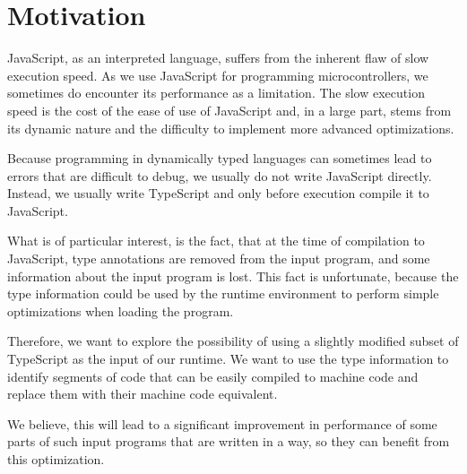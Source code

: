 \chapter{Motivation}

JavaScript, as an interpreted language, suffers from the inherent flaw of slow execution speed. As we use JavaScript for programming microcontrollers, we sometimes do encounter its performance as a limitation. The slow execution speed is the cost of the ease of use of JavaScript and, in a large part, stems from its dynamic nature and the difficulty to implement more advanced optimizations.

Because programming in dynamically typed languages can sometimes lead to errors that are difficult to debug, we usually do not write JavaScript directly. Instead, we usually write TypeScript and only before execution compile it to JavaScript.

What is of particular interest, is the fact, that at the time of compilation to JavaScript, type annotations are removed from the input program, and some information about the input program is lost. This fact is unfortunate, because the type information could be used by the runtime environment to perform simple optimizations when loading the program.

Therefore, we want to explore the possibility of using a slightly modified subset of TypeScript as the input of our runtime. We want to use the type information to identify segments of code that can be easily compiled to machine code and replace them with their machine code equivalent.


We believe, this will lead to a significant improvement in performance of some parts of such input programs that are written in a way, so they can benefit from this optimization.
